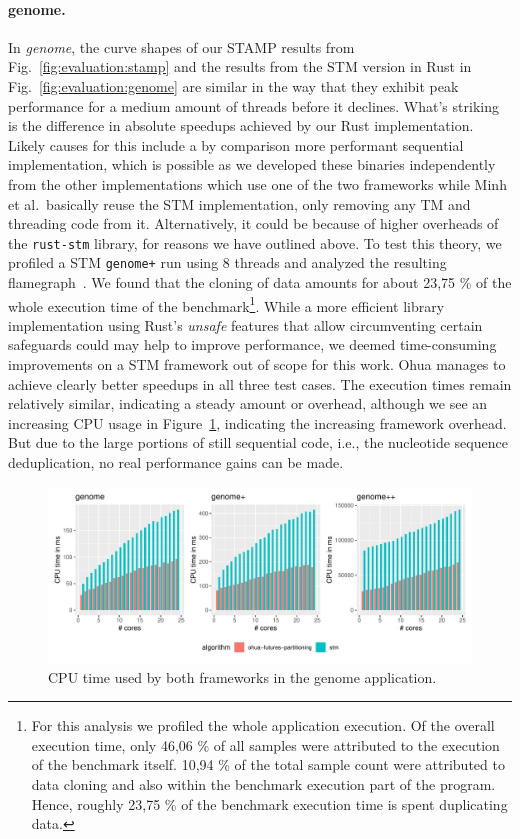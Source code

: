 \paragraph{genome.} In \emph{genome}, the curve shapes of our STAMP results from Fig.~\ref{fig:evaluation:stamp} and the results from the STM version in Rust in Fig.~\ref{fig:evaluation:genome} are similar in the way that they exhibit peak performance for a medium amount of threads before it declines.
What's striking is the difference in absolute speedups achieved by our Rust implementation.
Likely causes for this include a by comparison more performant sequential implementation, which is possible as we developed these binaries independently from the other implementations which use one of the two frameworks while Minh et al.\ basically reuse the STM implementation, only removing any TM and threading code from it.
Alternatively, it could be because of higher overheads of the \texttt{rust-stm} library, for reasons we have outlined above.
To test this theory, we profiled a STM \texttt{genome+} run using 8 threads and analyzed the resulting flamegraph~\cite{gregg2016flame}.
We found that the cloning of data amounts for about 23,75 \% of the whole execution time of the benchmark\footnote{For this analysis we profiled the whole application execution. Of the overall execution time, only 46,06 \% of all samples were attributed to the execution of the benchmark itself. 10,94 \% of the total sample count were attributed to data cloning and also within the benchmark execution part of the program. Hence, roughly 23,75 \% of the benchmark execution time is spent duplicating data.}.
While a more efficient library implementation using Rust's \emph{unsafe} features that allow circumventing certain safeguards could may help to improve performance, we deemed time-consuming improvements on a STM framework out of scope for this work.
Ohua manages to achieve clearly better speedups in all three test cases.
The execution times remain relatively similar, indicating a steady amount or overhead, although we see an increasing CPU usage in Figure~\ref{fig:evaluation:genome-cpu}, indicating the increasing framework overhead.
But due to the large portions of still sequential code, i.e., the nucleotide sequence deduplication, no real performance gains can be made.

\begin{figure}
    \centering
    \includegraphics[width=\textwidth,keepaspectratio]{gfx/results/cpu_genome_comb}
    \caption{CPU time used by both frameworks in the genome application.}%
    \label{fig:evaluation:genome-cpu}
\end{figure}


